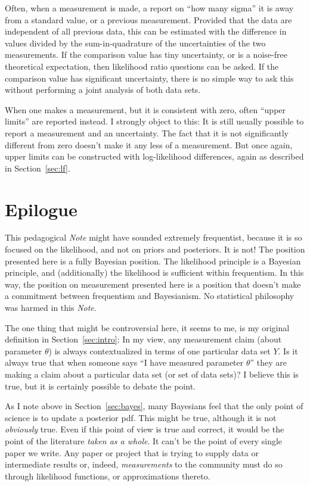 \documentclass{article}
\newcommand{\documentname}{\textsl{Note}}
\newcommand{\sectionname}{Section}
\newcommand{\secref}[1]{\sectionname~\ref{#1}}
\begin{document}
Often, when a measurement is made, a report on ``how many sigma'' it is away from a standard value, or a previous measurement.
Provided that the data are independent of all previous data, this can be estimated with the difference in values divided by the sum-in-quadrature of the uncertainties of the two measurements.
If the comparison value has tiny uncertainty, or is a noise-free theoretical expectation, then likelihood ratio questions can be asked.
If the comparison value has significant uncertainty, there is no simple way to ask this without performing a joint analysis of both data sets.

When one makes a measurement, but it is consistent with zero, often ``upper limits'' are reported instead.
I strongly object to this: It is still usually possible to report a measurement and an uncertainty.
The fact that it is not significantly different from zero doesn't make it any less of a measurement.
But once again, upper limits can be constructed with log-likelihood differences, again as described in \secref{sec:lf}.

\section{Epilogue}\label{sec:discussion}
This pedagogical \documentname{} might have sounded extremely frequentist, because it is so focused on the likelihood, and not on priors and posteriors.
It is not!
The position presented here is a fully Bayesian position.
The likelihood principle is a Bayesian principle, and (additionally) the likelihood is sufficient within frequentism.
In this way, the position on measurement presented here is a position that doesn't make a commitment between frequentism and Bayesianism.
No statistical philosophy was harmed in this \documentname.

The one thing that might be controversial here, it seems to me, is my original definition in \secref{sec:intro}:
In my view, any measurement claim (about parameter $\theta$) is always contextualized in terms of one particular data set $Y$.
Is it always true that when someone says ``I have measured parameter $\theta$'' they are making a claim about a particular data set (or set of data sets)?
I believe this is true, but it is certainly possible to debate the point.

As I note above in \secref{sec:bayes}, many Bayesians feel that the only point of science is to update a posterior pdf.
This might be true, although it is not \emph{obviously} true.
Even if this point of view is true and correct, it would be the point of the literature \emph{taken as a whole}. 
It can't be the point of every single paper we write.
Any paper or project that is trying to supply data or intermediate results or, indeed, \emph{measurements} to the community must do so through likelihood functions, or approximations thereto.
\end{document}
